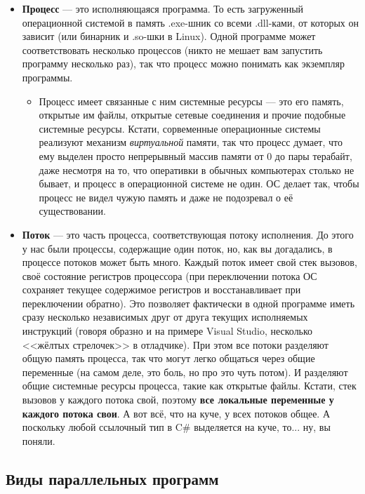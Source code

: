 \documentclass[a5paper]{article}
\begin{document}
\begin{itemize}
    \item \textbf{Процесс} --- это исполняющаяся программа. То есть загруженный операционной системой в память .exe-шник со всеми .dll-ками, от которых он зависит (или бинарник и .so-шки в Linux). Одной программе может соответствовать несколько процессов (никто не мешает вам запустить программу несколько раз), так что процесс можно понимать как экземпляр программы.
    \begin{itemize}
        \item Процесс имеет связанные с ним системные ресурсы --- это его память, открытые им файлы, открытые сетевые соединения и прочие подобные системные ресурсы. Кстати, сорвеменные операционные системы реализуют механизм \textit{виртуальной} памяти, так что процесс думает, что ему выделен просто непрерывный массив памяти от 0 до пары терабайт, даже несмотря на то, что оперативки в обычных компьютерах столько не бывает, и процесс в операционной системе не один. ОС делает так, чтобы процесс не видел чужую память и даже не подозревал о её существовании.
    \end{itemize}
    \item \textbf{Поток} --- это часть процесса, соответствующая потоку исполнения. До этого у нас были процессы, содержащие один поток, но, как вы догадались, в процессе потоков может быть много. Каждый поток имеет свой стек вызовов, своё состояние регистров процессора (при переключении потока ОС сохраняет текущее содержимое регистров и восстанавливает при переключении обратно). Это позволяет фактически в одной программе иметь сразу несколько независимых друг от друга текущих исполняемых инструкций (говоря образно и на примере Visual Studio, несколько <<жёлтых стрелочек>> в отладчике). При этом все потоки разделяют общую память процесса, так что могут легко общаться через общие переменные (на самом деле, это боль, но про это чуть потом). И разделяют общие системные ресурсы процесса, такие как открытые файлы. Кстати, стек вызовов у каждого потока свой, поэтому \textbf{все локальные переменные у каждого потока свои}. А вот всё, что на куче, у всех потоков общее. А поскольку любой ссылочный тип в C\# выделяется на куче, то... ну, вы поняли.
\end{itemize}

\subsection{Виды параллельных программ}
\end{document}
